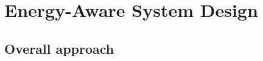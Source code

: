 \documentclass[conference]{IEEEtran}
\begin{document}


\section{Energy-Aware System Design} 
\label{sec:approach}

\subsection{Overall approach}
\end{document}
